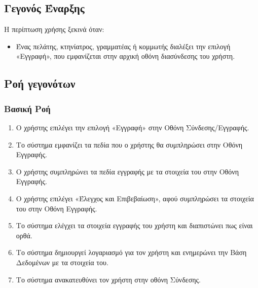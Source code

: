 \documentclass[12pt,a4paper,twoside]{book}
\begin{document}
\subsection{Γεγονός Έναρξης}
Η περίπτωση χρήσης ξεκινά όταν:
\begin{itemize}
  \item Ένας πελάτης, κτηνίατρος, γραμματέας ή κομμωτής διαλέξει την επιλογή «Εγγραφή», που εμφανίζεται στην αρχική οθόνη διασύνδεσης του χρήστη.  %
\end{itemize}

\subsection{Ροή γεγονότων}

\subsubsection{Βασική Ροή}
\begin{enumerate}
  \item Ο χρήστης επιλέγει την επιλογή «Εγγραφή» στην Οθόνη Σύνδεσης/Εγγραφής.  %
  \item Το σύστημα εμφανίζει τα πεδία που ο χρήστης θα συμπληρώσει στην Οθόνη Εγγραφής. %
  \item Ο χρήστης συμπληρώνει τα πεδία εγγραφής με τα στοιχεία του στην Οθόνη Εγγραφής. %
  \item Ο χρήστης επιλέγει «Έλεγχος και Επιβεβαίωση», αφού συμπληρώσει τα στοιχεία του στην Οθόνη Εγγραφής. %
  \item Το σύστημα ελέγχει τα στοιχεία εγγραφής του χρήστη και διαπιστώνει πως είναι ορθά.  %
  \item Το σύστημα δημιουργεί λογαριασμό για τον χρήστη και ενημερώνει την Βάση Δεδομένων με τα στοιχεία του. %
  \item Το σύστημα ανακατευθύνει τον χρήστη στην οθόνη Σύνδεσης. %
\end{enumerate}
\end{document}
